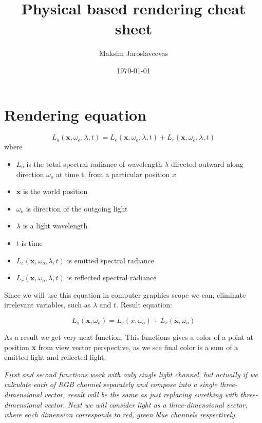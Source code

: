 \documentclass{article}
\title{Physical based rendering cheat sheet}
\author{Maksim Jaroslavcevas}
\date{\today}
\begin{document}
\maketitle

\section{Rendering equation}
\[
L_{o}(\textbf{x}, \omega_{o}, \lambda, t) = L_{e}(\textbf{x}, \omega_{o}, \lambda, t) + L_{r}(\textbf{x}, \omega_{o}, \lambda, t)
\]
where

\begin{itemize}
    \item $L_{o}$ is the total spectral radiance of wavelength $\lambda$ directed outward along direction $\omega_{o}$ at time t, from a particular position $x$
    \item $\textbf{x}$ is the world position
    \item $\omega_{o}$ is direction of the outgoing light
    \item $\lambda$ is a light wavelength
    \item $t$ is time
    \item $L_{e}(\textbf{x}, \omega_{o}, \lambda, t)$ is emitted spectral radiance
    \item $L_{r}(\textbf{x}, \omega_{o}, \lambda, t)$ is reflected spectral radiance
\end{itemize}

Since we will use this equation in computer graphics scope we can, eliminate irrelevant 
variables, such as $\lambda$ and $t$. Result equation:

\begin{equation}
    L_{o}(\textbf{x}, \omega_{o}) = L_{e}(x, \omega_{o}) + L_{r}(\textbf{x}, \omega_{o})
\end{equation}

As a result we get very neat function. This functions gives a color of a point at position \textbf{x} 
from view vector perspective, as we see final color is a sum of a emitted light and reflected light.

\textit{First and second functions work with only single light channel, 
but actually if we calculate each of RGB channel separately and compose 
into a single three-dimensional vector, result will be the same as just 
replacing evrething with three-dimensional vector. Next we will consider 
light as a three-dimensional vector, where each dimension corresponds to
red, green blue channels respectively.}
\end{document}

